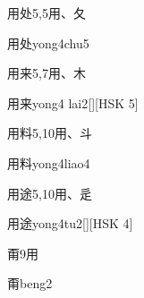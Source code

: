 \begin{entry}{用处}{5,5}{⽤、⼡}
  \begin{phonetics}{用处}{yong4chu5}
  \end{phonetics}
\end{entry}

\begin{entry}{用来}{5,7}{⽤、⽊}
  \begin{phonetics}{用来}{yong4 lai2}[][HSK 5]
  \end{phonetics}
\end{entry}

\begin{entry}{用料}{5,10}{⽤、⽃}
  \begin{phonetics}{用料}{yong4liao4}
  \end{phonetics}
\end{entry}

\begin{entry}{用途}{5,10}{⽤、⾡}
  \begin{phonetics}{用途}{yong4tu2}[][HSK 4]
  \end{phonetics}
\end{entry}

\begin{entry}{甭}{9}{⽤}
  \begin{phonetics}{甭}{beng2}
  \end{phonetics}
\end{entry}


